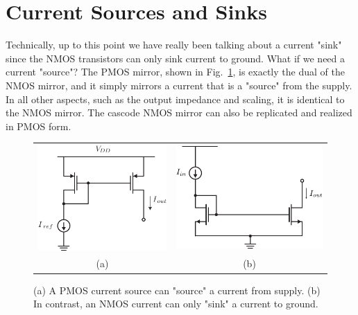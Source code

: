 \section{Current Sources and Sinks}
Technically, up to this point we have really been talking about a current "sink" since the NMOS transistors can only sink current to ground.  What if we need a current "source"?  The PMOS mirror, shown in Fig.~\ref{fig:18mirror_pmos.pdf}, is exactly the dual of the NMOS mirror, and it simply mirrors a current that is a "source" from the supply.  In all other aspects, such as the output impedance and scaling, it is identical to the NMOS mirror.  The cascode NMOS mirror can also be replicated and realized in PMOS form. 
\begin{figure}[tb]
\centering
\begin{tabular}{cc}
\includegraphics[scale=1]{18mirror_pmos.pdf} &
\includegraphics[scale=1]{nmos_source_mirror}\\ 
(a) & (b)\\
\end{tabular}
\caption{(a) A PMOS current source can "source" a current from supply.  (b) In contrast, an NMOS current can only "sink" a current to ground.}
\label{fig:18mirror_pmos.pdf}
\end{figure}
